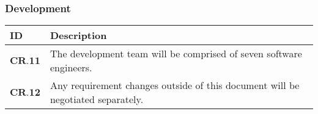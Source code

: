 \subsubsection{Development}
\begin{longtable}[H]{| p{1.2cm} | p{15.3cm} |}
		\hline
		\cellcolor{titleColor}\textbf{ID}		&	\cellcolor{titleColor}\textbf{Description}	\\	\hline
		$\textbf{CR.11} $     &       The development team will be comprised of seven software engineers.         \\ \hline
		$\textbf{CR.12}$      &       Any requirement changes outside of this document will be negotiated separately.         \\ \hline
\end{longtable}
